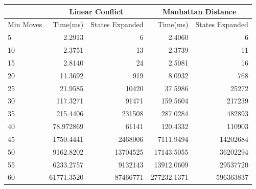 \documentclass[final]{cmpreport}
\begin{document}
\begin{center}

	\begin{tabular}{|l|r|r|r|r|} \cline{2-5}
		
		\multicolumn{1}{c}{} & \multicolumn{2}{|c|}{Linear Conflict} &
		\multicolumn{2}{|c|}{Manhattan Distance} \\ \hline
		Min Moves & Time(ms) & States Expanded & Time(ms) & States Expanded \\	\hline \hline
		5  & 2.2913 & 6                        & 2.4060       &          6            \\
		10 & 2.3751  & 13                      & 2.3739       &         11            \\
		15 & 2.8140 & 24                       & 2.5081          &      16            \\
		20 & 11.3692 & 919                     & 8.0932        &        768           \\
		25&  21.9585  & 10420                  & 37.5986        &       25272         \\
		30& 117.3271 & 91471                   & 159.5604        &      217239        \\
		35  & 215.4406 & 231508                & 287.0284        &      482893        \\
		40& 78.972869 & 61141                  & 120.4332          &    110903        \\
		45 & 1750.4441 & 2468006               & 7111.9494        &     14202684      \\
		50& 9162.8202 & 13704525               & 17143.5055         &   36202294       \\
		55 & 6233.2757 & 9132143               & 13912.0609        &    29537720       \\
		60 & 61771.3520 & 87466771             & 277232.1371      &     596363837      \\
		\hline
		
	\end{tabular}
	
\end{center}
\end{document}
